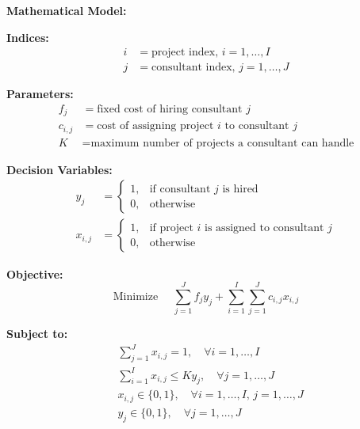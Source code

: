 \documentclass{article}
\begin{document}
\textbf{Mathematical Model:}

\textbf{Indices:}
\begin{align*}
i & = \text{project index, } i = 1, \ldots, I \\
j & = \text{consultant index, } j = 1, \ldots, J
\end{align*}

\textbf{Parameters:}
\begin{align*}
f_j & = \text{fixed cost of hiring consultant } j \\
c_{i,j} & = \text{cost of assigning project } i \text{ to consultant } j \\
K & = \text{maximum number of projects a consultant can handle}
\end{align*}

\textbf{Decision Variables:}
\begin{align*}
y_j & = 
\begin{cases} 
1, & \text{if consultant } j \text{ is hired} \\
0, & \text{otherwise}
\end{cases} \\
x_{i,j} & = 
\begin{cases} 
1, & \text{if project } i \text{ is assigned to consultant } j \\
0, & \text{otherwise}
\end{cases}
\end{align*}

\textbf{Objective:}
\[
\text{Minimize } \quad \sum_{j=1}^{J} f_j y_j + \sum_{i=1}^{I} \sum_{j=1}^{J} c_{i,j} x_{i,j}
\]

\textbf{Subject to:}
\begin{align*}
& \sum_{j=1}^{J} x_{i,j} = 1, \quad \forall i = 1, \ldots, I \\
& \sum_{i=1}^{I} x_{i,j} \leq K y_j, \quad \forall j = 1, \ldots, J \\
& x_{i,j} \in \{0, 1\}, \quad \forall i = 1, \ldots, I, \, j = 1, \ldots, J \\
& y_j \in \{0, 1\}, \quad \forall j = 1, \ldots, J
\end{align*}
\end{document}
